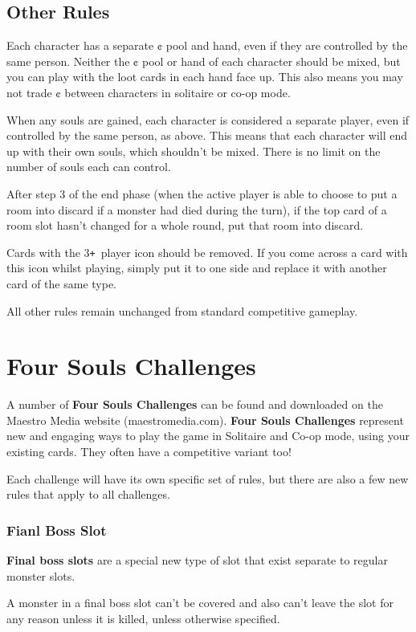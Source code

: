 \documentclass[a4paper, twoside]{report} %
\def\plus{\texttt{+}}
\begin{document}
    \section{Other Rules}
    Each character has a separate ¢ pool and hand, even if they are controlled by the same person. Neither the ¢ pool or hand of each character should be mixed, but you can play with the loot cards in each hand face up. This also means you may not trade ¢ between characters in solitaire or co-op mode.

    When any souls are gained, each character is considered a separate player, even if controlled by the same person, as above. This means that each character will end up with their own souls, which shouldn’t be mixed. There is no limit on the number of souls each can control.

    After step 3 of the end phase (when the active player is able to choose to put a room into discard if a monster had died during the turn), if the top card of a room slot hasn’t changed for a whole round, put that room into discard.

    Cards with the 3\plus\ player icon should be removed. If you come across a card with this icon whilst playing, simply put it to one side and replace it with another card of the same type.

    All other rules remain unchanged from standard competitive gameplay.

    \chapter{Four Souls Challenges}
    A number of \textbf{Four Souls Challenges} can be found and downloaded on the Maestro Media website (maestromedia.com). \textbf{Four Souls Challenges} represent new and engaging ways to play the game in Solitaire and Co-op mode, using your existing cards. They often have a competitive variant too!

    Each challenge will have its own specific set of rules, but there are also a few new rules that apply to all challenges.

    \subsection*{Fianl Boss Slot}
    \textbf{Final boss slots} are a special new type of slot that exist separate to regular monster slots.

    A monster in a final boss slot can’t be covered and also can’t leave the slot for any reason unless it is killed, unless otherwise specified.
\end{document}
